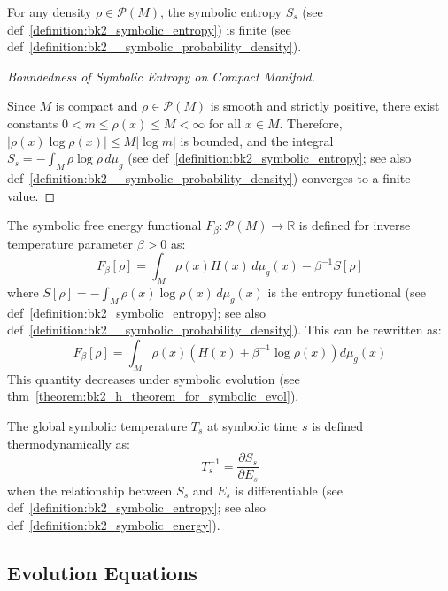 \begin{lemma} 
\label{lemma:bk2_finiteness_of_symbolic_entropy} 
For any density $\rho \in \mathcal{P}(M)$, the symbolic entropy $S_s$ (see def~\ref{definition:bk2_symbolic_entropy}) is finite (see def~\ref{definition:bk2__symbolic_probability_density}).
\end{lemma}

\begin{proof}[Boundedness of Symbolic Entropy on Compact Manifold]
\label{proof:bk2_bounded_symbolic_entropy}
\leavevmode

Since $M$ is compact and $\rho \in \mathcal{P}(M)$ is smooth and strictly positive, there exist constants $0 < m \leq \rho(x) \leq M < \infty$ for all $x \in M$. Therefore, $|\rho(x) \log\rho(x)| \leq M|\log m|$ is bounded, and the integral $S_s = -\int_M \rho \log\rho \, d\mu_g$ (see def~\ref{definition:bk2_symbolic_entropy}; see also def~\ref{definition:bk2__symbolic_probability_density}) converges to a finite value.
\end{proof}

\begin{definition} 
\label{definition:bk2_symbolic_free_energy} 
The symbolic free energy functional $F_\beta: \mathcal{P}(M) \rightarrow \mathbb{R}$ is defined for inverse temperature parameter $\beta > 0$ as:
\[
F_\beta[\rho] = \int_M \rho(x) H(x) \, d\mu_g(x) - \beta^{-1} S[\rho]
\]
where $S[\rho] = -\int_M \rho(x) \log\rho(x) \, d\mu_g(x)$ is the entropy functional (see def~\ref{definition:bk2_symbolic_entropy}; see also def~\ref{definition:bk2__symbolic_probability_density}). This can be rewritten as:
\[
F_\beta[\rho] = \int_M \rho(x) \left(H(x) + \beta^{-1}\log\rho(x)\right) d\mu_g(x)
\]
This quantity decreases under symbolic evolution (see thm~\ref{theorem:bk2_h_theorem_for_symbolic_evol}).
\end{definition}

\begin{definition} 
\label{definition:bk2_symbolic_temperature} 
The global symbolic temperature $T_s$ at symbolic time $s$ is defined thermodynamically as:
\[
T_s^{-1} = \frac{\partial S_s}{\partial E_s}
\]
when the relationship between $S_s$ and $E_s$ is differentiable (see def~\ref{definition:bk2_symbolic_entropy}; see also def~\ref{definition:bk2_symbolic_energy}).
\end{definition}

\subsection{Evolution Equations}
\label{subsec:bk2_evolution_equations}

